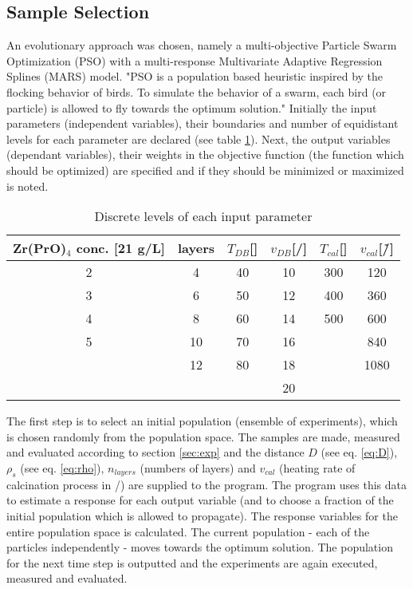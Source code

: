 \subsection{Sample Selection}
\label{sec:ss}
An evolutionary approach was chosen, namely a multi-objective Particle Swarm Optimization (PSO) with a multi-response
Multivariate Adaptive Regression Splines (MARS) model\cite{villanova2010function,Kennedy1995,Breiman1997,Carta2011}.
%
"PSO is a population based heuristic inspired by the flocking behavior of birds. 
To simulate the behavior of a swarm, each bird (or particle) is allowed to fly towards the optimum solution."\cite{villanova2010function}
%
Initially the input parameters (independent variables), their boundaries and number of equidistant levels for each parameter are declared (see table \ref{tab:input}).
Next, the output variables (dependant variables), their weights in the objective function (the function which should be optimized) are specified and if they should be minimized or maximized is noted.
%
\begin{table}[htb]
	\centering
	\begin{tabular}{cc cc cc}
		\hline
		Zr(PrO)$_4$ conc. [21 g/L]	&layers	&$T_{DB}$[\oc{}]	&$v_{DB}$[\mm{}/\s{}]	&$T_{cal}$[\oc{}]	&$v_{cal}$[\oc{}/\h{}]	\\
		\hline
		2				&4		&40					&10				&300				&120	\\
		3				&6		&50					&12				&400				&360	\\
		4				&8		&60					&14				&500				&600	\\
		5				&10		&70					&16				&					&840	\\
						&12		&80					&18				&					&1080	\\
						&		&					&20				&					&		\\
		\hline
	\end{tabular}
	\caption{Discrete levels of each input parameter \td{are concentrations correct?}}
	\label{tab:input}
\end{table}

The first step is to select an initial population (ensemble of experiments), which is chosen randomly from the population space. 
The samples are made, measured and evaluated according to section \ref{sec:exp} and the distance $D$ (see eq. \ref{eq:D}), $\rho_s$ (see eq. \ref{eq:rho}), $n_{layers}$ (numbers of layers) and $v_{cal}$ (heating rate of calcination process in \oc{}/\minutes{}) are supplied to the program. 
The program uses this data to estimate a response for each output variable (and to choose a fraction of the initial population which is allowed to propagate).
The response variables for the entire population space is calculated. 
The current population - each of the particles independently - moves towards the optimum solution.
The population for the next time step is outputted and the experiments are again executed, measured and evaluated.


